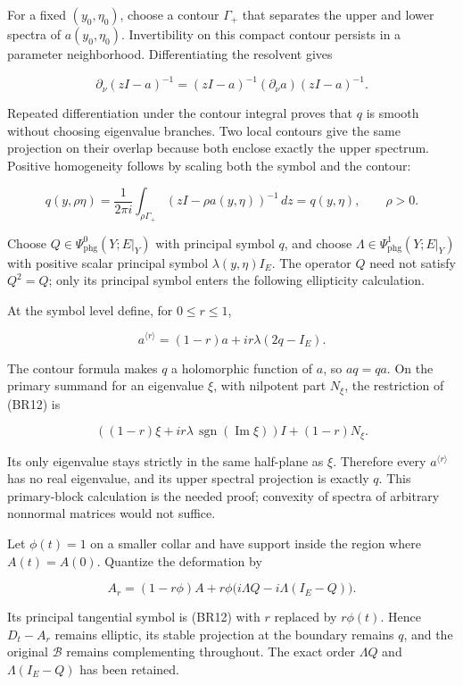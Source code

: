 \documentclass[
  11pt,
]{article}
\begin{document}
For a fixed \((y_0,\eta_0)\), choose a contour \(\Gamma_+\) that
separates the upper and lower spectra of \(a(y_0,\eta_0)\).
Invertibility on this compact contour persists in a parameter
neighborhood. Differentiating the resolvent gives

\[
 \partial_\nu(zI-a)^{-1}
 =(zI-a)^{-1}(\partial_\nu a)(zI-a)^{-1}.
 \tag{BR10}
\]

Repeated differentiation under the contour integral proves that \(q\) is
smooth without choosing eigenvalue branches. Two local contours give the
same projection on their overlap because both enclose exactly the upper
spectrum. Positive homogeneity follows by scaling both the symbol and
the contour:

\[
 q(y,\rho\eta)
 =\frac{1}{2\pi i}\int_{\rho\Gamma_+}
 (zI-\rho a(y,\eta))^{-1}\,dz
 =q(y,\eta),\qquad \rho>0 .
 \tag{BR11}
\]

Choose \(Q\in\Psi_{\mathrm{phg}}^0(Y;E|_Y)\) with principal symbol
\(q\), and choose \(\Lambda\in\Psi_{\mathrm{phg}}^1(Y;E|_Y)\) with
positive scalar principal symbol \(\lambda(y,\eta)I_E\). The operator
\(Q\) need not satisfy \(Q^2=Q\); only its principal symbol enters the
following ellipticity calculation.

At the symbol level define, for \(0\leq r\leq1\),

\[
 a^{\langle r\rangle}
 =(1-r)a+i r\lambda(2q-I_E).
 \tag{BR12}
\]

The contour formula makes \(q\) a holomorphic function of \(a\), so
\(aq=qa\). On the primary summand for an eigenvalue \(\xi\), with
nilpotent part \(N_\xi\), the restriction of (BR12) is

\[
 \left((1-r)\xi+i r\lambda\,
 \operatorname{sgn}(\operatorname{Im}\xi)\right)I
 +(1-r)N_\xi .
 \tag{BR13}
\]

Its only eigenvalue stays strictly in the same half-plane as \(\xi\).
Therefore every \(a^{\langle r\rangle}\) has no real eigenvalue, and its
upper spectral projection is exactly \(q\). This primary-block
calculation is the needed proof; convexity of spectra of arbitrary
nonnormal matrices would not suffice.

Let \(\phi(t)=1\) on a smaller collar and have support inside the region
where \(A(t)=A(0)\). Quantize the deformation by

\[
 A_r=(1-r\phi)A
 +r\phi\bigl(i\Lambda Q-i\Lambda(I_E-Q)\bigr).
 \tag{BR14}
\]

Its principal tangential symbol is (BR12) with \(r\) replaced by
\(r\phi(t)\). Hence \(D_t-A_r\) remains elliptic, its stable projection
at the boundary remains \(q\), and the original \(\mathcal B\) remains
complementing throughout. The exact order \(\Lambda Q\) and
\(\Lambda(I_E-Q)\) has been retained.
\end{document}
